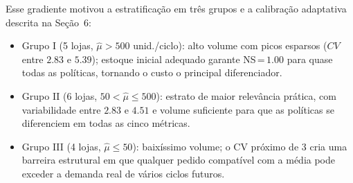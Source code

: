 \documentclass[a4paper,11pt]{article}
\begin{document}
Esse gradiente motivou a estratificação em três grupos e a
calibração adaptativa descrita na Seção~6:

\begin{itemize}
  \item Grupo I (5 lojas, $\hat{\mu} > 500$ unid./ciclo):
    alto volume com picos esparsos ($CV$ entre $2.83$ e $5.39$);
    estoque inicial adequado garante NS\,=\,$1.00$ para quase todas
    as políticas, tornando o custo o principal diferenciador.
  \item Grupo II (6 lojas, $50 < \hat{\mu} \leq 500$):
    estrato de maior relevância prática, com variabilidade entre
    $2.83$ e $4.51$ e volume suficiente para que as políticas se
    diferenciem em todas as cinco métricas.
  \item Grupo III (4 lojas, $\hat{\mu} \leq 50$):
    baixíssimo volume; o CV próximo de 3 cria uma barreira estrutural
    em que qualquer pedido compatível com a média pode exceder a
    demanda real de vários ciclos futuros.
\end{itemize}
\end{document}
